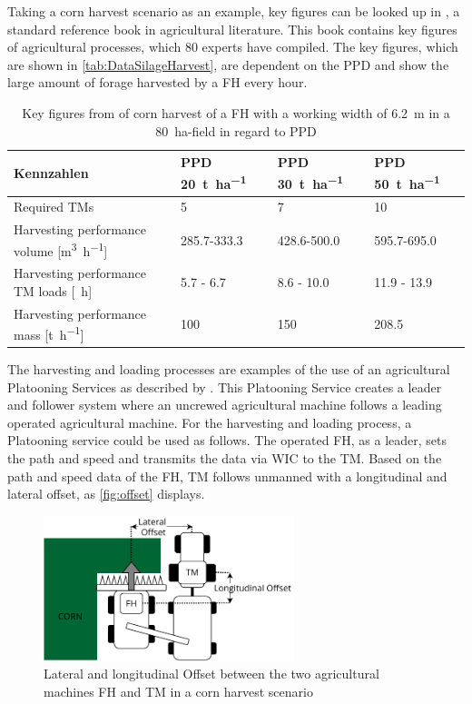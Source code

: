 \documentclass[]{nsm-thesis}
\begin{document}
Taking a corn harvest scenario as an example, key figures can be looked up in \cite{faustzahlen2018}, a standard reference book in agricultural literature. This book contains key figures of agricultural processes, which 80 experts have compiled. The key figures, which are shown in \autoref{tab:DataSilageHarvest}, are dependent on the \ac{PPD} and show the large amount of forage harvested by  a  \ac{FH} every hour.
\begin{table}
	\centering
	\begin{tabular}{>{\raggedright}p{5.5cm}p{1.6cm}p{1.6cm}p{1.6cm}}
		\toprule
		Kennzahlen & \ac{PPD} \SI{20}{\tonne\per\hectare} & \ac{PPD} \SI{30}{\tonne\per\hectare} & \ac{PPD} \SI{50}{\tonne\per\hectare}\\
		\midrule
		Required \ac{TM}s & \num{5}&
		\num{7} & \num{10} \\
		Harvesting performance volume [\si{\cubic\metre\per\hour}] &
		\num{285.7}-\num{333.3}
		& \num{428.6}-\num{500.0} &
		\num{595.7}-\num{695.0}\\
		Harvesting performance \ac{TM} loads [\si{\per\hour}] &
		\num{5.7} - \num{6.7}
		& \num{8.6} - \num{10.0} &
		\num{11.9} - \num{13.9}\\
		Harvesting performance mass [\si{\tonne\per\hour}] & \num{100}
		 & \num{150} &
		\num{208.5} \\
		\bottomrule
	\end{tabular}
	\caption{Key figures from \cite{faustzahlen2018} of corn harvest of a \ac{FH} with a working width of \SI{6.2}{\metre} in a \SI{80}{\hectare}-field in regard to \ac{PPD}}
	\label{tab:DataSilageHarvest}
\end{table}

The harvesting and loading processes are examples of the use of an agricultural Platooning Services as described by 
\textcite{zhang_method_2009}.
This Platooning Service creates a leader and follower system where an uncrewed agricultural machine follows a leading operated agricultural machine.
For the harvesting and loading process, a Platooning service could be used as follows.
The operated \ac{FH}, as a leader, sets the path and speed and transmits the data via \ac{WIC} to the \ac{TM}. Based on the path and speed data of the \ac{FH}, \ac{TM} follows unmanned with a longitudinal and lateral offset, as \autoref{fig:offset} displays.
\begin{figure}%
	\centering
	\includegraphics[width=0.65\textwidth]{figures/offset_platoon.pdf}
	\caption{Lateral and longitudinal Offset between the two agricultural machines \ac{FH} and \ac{TM} in a corn harvest scenario}%
	\label{fig:offset}%
\end{figure}
\end{document}
